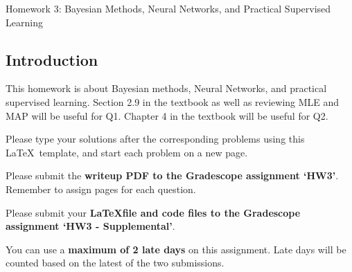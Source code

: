 \documentclass[submit]{harvardml}
\begin{document}
\begin{center}
{\Large Homework 3: Bayesian Methods, Neural Networks, and Practical Supervised Learning}\\
\end{center}

\subsection*{Introduction}

This homework is about Bayesian methods, Neural Networks, and practical supervised
learning.  Section 2.9 in the textbook as well as reviewing MLE and MAP will be useful for Q1. Chapter 4 in the textbook will be useful for Q2.

Please type your solutions after the corresponding problems using this
\LaTeX\ template, and start each problem on a new page.

Please submit the \textbf{writeup PDF to the Gradescope assignment `HW3'}. Remember to assign pages for each question. 

Please submit your \textbf{\LaTeX file and code files to the Gradescope assignment `HW3 - Supplemental'}. 

You can use a \textbf{maximum of 2 late days} on this assignment.  Late days will be counted based on the latest of the two submissions.
\\

\newpage
\end{document}
